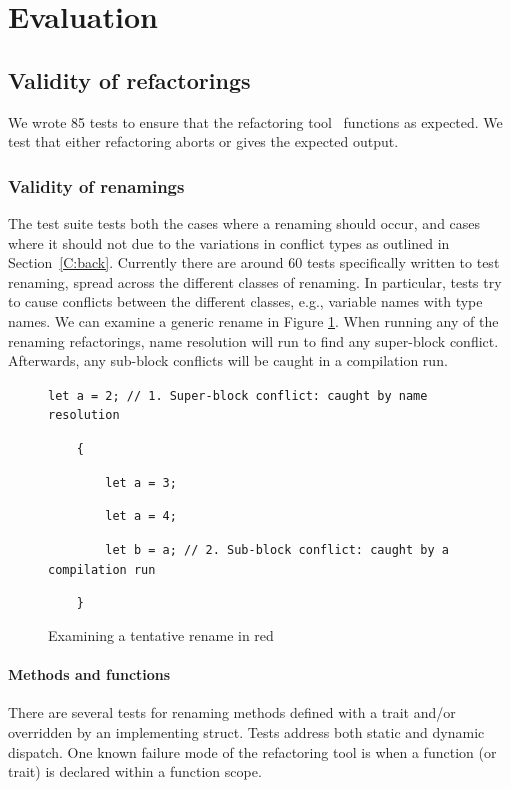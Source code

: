 \section{Evaluation}\label{C:eval}

\subsection{Validity of refactorings}\label{S:validity}

We wrote 85 tests to ensure that the refactoring tool~\cite{rrproject} functions as expected. We test that either refactoring aborts or gives the expected output.

\subsubsection{Validity of renamings}

The test suite tests both the cases where a renaming should occur, and cases where it should not due to the variations in conflict types as outlined in Section~\ref{C:back}. Currently there are around 60 tests specifically written to test renaming, spread across the different classes of renaming. In particular, tests try to cause conflicts between the different classes, e.g., variable names with type names. We can examine a generic rename in Figure \ref{Fig:walk}. When running any of the renaming refactorings, name resolution will run to find any super-block conflict. Afterwards, any sub-block conflicts will be caught in a compilation run. 

\begin{figure}
{\verb|let a = 2; // 1. Super-block conflict: caught by name resolution|}

{\verb|    {|}

{\verb|        let |}{\color{red}\verb|a|}{\verb| = 3;|}

{\verb|        let a = 4;|}

{\verb|        let b = |}{\color{red}\verb|a|}{\verb|; // 2. Sub-block conflict: caught by a compilation run|}

{\verb|    }|}
\caption{Examining a tentative rename in red}
\label{Fig:walk}
\end{figure}

\paragraph{Methods and functions}
There are several tests for renaming methods defined with a trait and/or overridden by an implementing struct. Tests address both static and dynamic dispatch. One known failure mode of the refactoring tool is when a function (or trait) is declared within a function scope.

